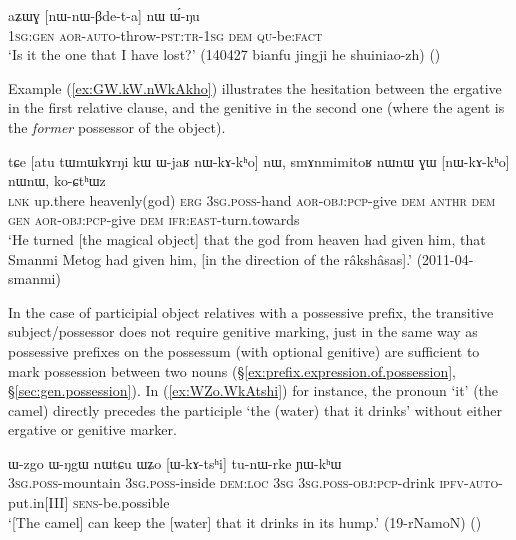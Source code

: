  \begin{exe}
\ex \label{ex:aZWG.nWnWBeta}
 \gll aʑɯɣ [nɯ-nɯ-βde-t-a] nɯ ɯ́-ŋu \\
 \textsc{1sg}:\textsc{gen} \textsc{aor}-\textsc{auto}-throw-\textsc{pst}:\textsc{tr}-\textsc{1sg} \textsc{dem} \textsc{qu}-be:\textsc{fact} \\
 \glt `Is it the one that I have lost?' (140427 bianfu jingji he shuiniao-zh)
 ()
\end{exe}

Example (\ref{ex:GW.kW.nWkAkho}) illustrates the hesitation between the ergative in the first relative clause, and the genitive in the second one (where the agent is the \textit{former} possessor of the object).

\begin{exe}
\ex \label{ex:GW.kW.nWkAkho}
 \gll tɕe [atu tɯmɯkɤrŋi kɯ ɯ-jaʁ nɯ-kɤ-kʰo] nɯ, smɤnmimitoʁ nɯnɯ ɣɯ [nɯ-kɤ-kʰo] nɯnɯ, ko-ɕtʰɯz\\
\textsc{lnk} up.there heavenly(god) \textsc{erg} \textsc{3sg}.\textsc{poss}-hand \textsc{aor}-\textsc{obj}:\textsc{pcp}-give \textsc{dem}  \textsc{anthr} \textsc{dem} \textsc{gen} \textsc{aor}-\textsc{obj}:\textsc{pcp}-give \textsc{dem} \textsc{ifr}:\textsc{east}-turn.towards\\
\glt `He turned [the magical object] that the god from heaven had given him, that Smanmi Metog had given him, [in the direction of the râkshâsas].' (2011-04-smanmi)
\end{exe}

In the case of participial object relatives with a possessive prefix, the transitive subject/possessor does not require genitive marking, just in the same way as possessive prefixes on the possessum (with optional genitive) are sufficient to mark possession between two nouns (§\ref{ex:prefix.expression.of.possession}, §\ref{sec:gen.possession}). In (\ref{ex:WZo.WkAtshi}) for instance, the pronoun  `it' (the camel) directly precedes the participle  `the (water) that it drinks' without either ergative or genitive marker.

\begin{exe}
\ex \label{ex:WZo.WkAtshi}
 \gll ɯ-zgo ɯ-ŋgɯ nɯtɕu ɯʑo [ɯ-kɤ-tsʰi] tu-nɯ-rke ɲɯ-kʰɯ \\
\textsc{3sg}.\textsc{poss}-mountain \textsc{3sg}.\textsc{poss}-inside \textsc{dem}:\textsc{loc} \textsc{3sg} \textsc{3sg}.\textsc{poss}-\textsc{obj}:\textsc{pcp}-drink \textsc{ipfv}-\textsc{auto}-put.in[III] \textsc{sens}-be.possible \\
\glt `[The camel] can keep the [water] that it drinks in its hump.' (19-rNamoN)
()
\end{exe}


